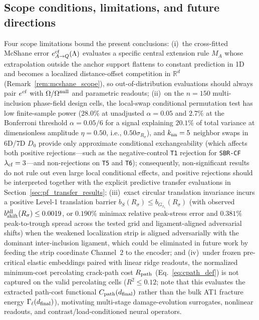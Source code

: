 \documentclass[preprint,11pt,a4paper]{elsarticle}
\newcommand{\R}{\mathbb{R}}
\newcommand{\ecf}{e^{\rm cf}}
\begin{document}
\subsection{Scope conditions, limitations, and future directions}

Four scope limitations bound the present conclusions:
(i)~the cross-fitted McShane error $\ecf_{A\to Q}(\Lambda)$ evaluates a specific central extension rule $M_A$ whose extrapolation outside the anchor support flattens to constant prediction in 1D and becomes a localized distance-offset competition in $\R^d$ (Remark~\ref{rem:mcshane_scope}), so out-of-distribution evaluations should always pair $\ecf$ with $\Omega/\Omega^{\rm null}$ and parametric readouts;
(ii)~on the $n=150$ multi-inclusion phase-field design cells, the local-swap conditional permutation test has low finite-sample power ($28.0\%$ at unadjusted $\alpha=0.05$ and $2.7\%$ at the Bonferroni threshold $\alpha=0.05/6$ for a signal explaining $20.1\%$ of total variance at dimensionless amplitude $\eta=0.50$, i.e., $0.50\sigma_{R_\sigma}$), and $k_{\rm nn}=5$ neighbor swaps in 6D/7D $D_0$ provide only approximate conditional exchangeability (which affects both positive rejections---such as the negative-control \texttt{T1} rejection for \texttt{SBR-CF} $\lambda_{\rm cf}=3$---and non-rejections on \texttt{T5} and \texttt{T6}); consequently, non-significant results do not rule out even large local conditional effects, and positive rejections should be interpreted together with the explicit predictive transfer evaluations in Section~\ref{sec:pf_transfer_results};
(iii)~exact circular translation invariance incurs a positive Level-1 translation barrier $b_S(R_\sigma)\le b_{G_{x_1}}(R_\sigma)$ (with observed $b_{\rm shift}^{\rm all}(R_\sigma)\le 0.0019$, or $0.190\%$ minimax relative peak-stress error and $0.381\%$ peak-to-trough spread across the tested grid and ligament-aligned adversarial shifts) when the weakened localization strip is aligned adversarially with the dominant inter-inclusion ligament, which could be eliminated in future work by feeding the strip coordinate Channel~$2$ to the encoder; and
(iv)~under frozen pre-critical elastic embeddings paired with linear ridge readouts, the normalized minimum-cost percolating crack-path cost $R_{\rm path}$ (Eq.~\eqref{eq:cpath_def}) is not captured on the valid percolating cells ($R^2\le 0.12$; note that this evaluates the extracted path-cost functional $C_{\rm path}(d_{\rm final})$ rather than the bulk AT1 fracture energy $\Gamma_\ell(d_{\rm final})$), motivating multi-stage damage-evolution surrogates, nonlinear readouts, and contrast/load-conditioned neural operators.
\end{document}
